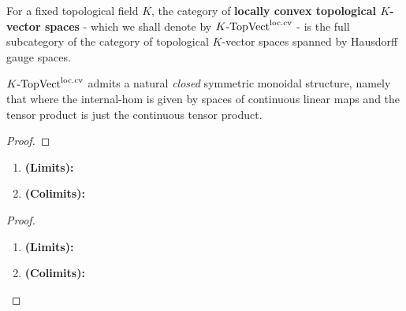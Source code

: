             \begin{definition} \label{def: locally_convex_topological_vector_spaces}
                For a fixed topological field $K$, the category of \textbf{locally convex topological $K$-vector spaces} - which we shall denote by $K\text{-}\mathrm{Top}\mathrm{Vect}^{\mathrm{loc}.\mathrm{cv}}$ - is the full subcategory of the category of topological $K$-vector spaces spanned by Hausdorff gauge spaces. 
            \end{definition}
            \begin{proposition} \label{prop: tensor_products_of_locally_convex_topological_vector_spaces}
                $K\text{-}\mathrm{Top}\mathrm{Vect}^{\mathrm{loc}.\mathrm{cv}}$ admits a natural \textit{closed} symmetric monoidal structure, namely that where the internal-hom is given by spaces of continuous linear maps and the tensor product is just the continuous tensor product.  
            \end{proposition}
                \begin{proof}
                            
                \end{proof}
            \begin{proposition} \label{prop: (co)limits_of_locally_convex_topological_vector_spaces}
                \noindent
                \begin{enumerate}
                    \item \textbf{(Limits):}
                    \item \textbf{(Colimits):}
                \end{enumerate}
            \end{proposition}
                \begin{proof}
                    \noindent
                    \begin{enumerate}
                        \item \textbf{(Limits):}
                        \item \textbf{(Colimits):}
                    \end{enumerate}
                \end{proof}
            
